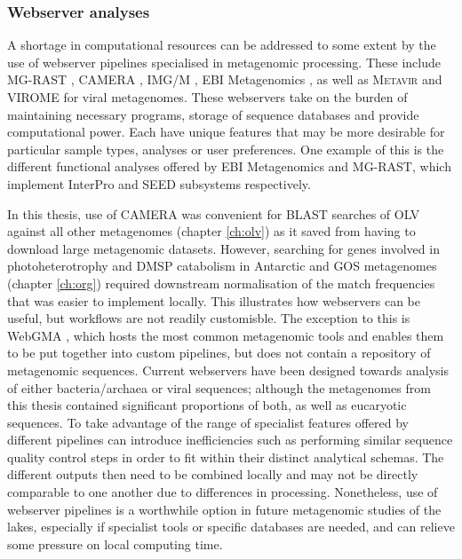 \subsubsection{Webserver analyses}
A shortage in computational resources can be addressed to some extent by the use of webserver pipelines specialised in metagenomic processing.
These include \ac{MG-RAST} \cite{Meyer2008}, \ac{CAMERA} \cite{Sun2011}, \ac{IMG/M} \cite{Markowitz2008, Markowitz2012}, EBI Metagenomics \cite{Hunter2012}, as well as \textsc{Metavir} \cite{Roux2011} and \ac{VIROME} \cite{Wommack2012} for viral metagenomes.
These webservers take on the burden of maintaining necessary programs, storage of sequence databases and provide computational power.
Each have unique features that may be more desirable for particular sample types, analyses or user preferences.
One example of this is the different functional analyses offered by EBI Metagenomics and \ac{MG-RAST}, which implement InterPro and SEED subsystems respectively.

In this thesis, use of \ac{CAMERA} was convenient for \acs{BLAST} searches of \ac{OLV} against all other metagenomes (chapter \ref{ch:olv}) as it saved from having to download large metagenomic datasets.
However, searching for genes involved in photoheterotrophy and \ac{DMSP} catabolism in Antarctic and \acs{GOS} metagenomes (chapter \ref{ch:org}) required downstream normalisation of the match frequencies that was easier to implement locally.
This illustrates how webservers can be useful, but workflows are not readily customisble.
The exception to this is WebGMA \cite{Wu2011}, which hosts the most common metagenomic tools and enables them to be put together into custom pipelines, but does not contain a repository of metagenomic sequences.
Current webservers have been designed towards analysis of either bacteria/archaea or viral sequences; although the metagenomes from this thesis contained significant proportions of both, as well as eucaryotic sequences.
To take advantage of the range of specialist features offered by different pipelines can introduce inefficiencies such as performing similar sequence quality control steps in order to fit within their distinct analytical schemas. 
The different outputs then need to be combined locally and may not be directly comparable to one another due to differences in processing.
Nonetheless, use of webserver pipelines is a worthwhile option in future metagenomic studies of the lakes, especially if specialist tools or specific databases are needed, and can relieve some pressure on local computing time.

